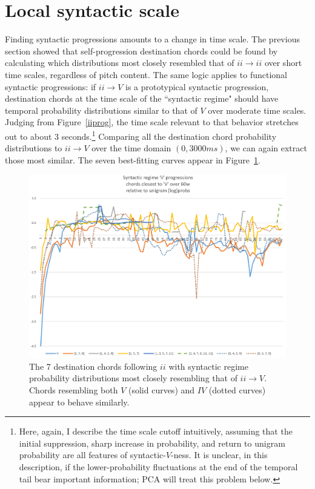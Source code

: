 \section{Local syntactic scale}
Finding syntactic progressions amounts to a change in time scale.  The previous section showed that self-progression destination chords could be found by calculating which distributions most closely resembled that of $ii\rightarrow ii$ over short time scales, regardless of pitch content.  The same logic applies to functional syntactic progressions: if $ii\rightarrow V$ is a prototypical syntactic progression, destination chords at the time scale of the ``syntactic regime" should have temporal probability distributions similar to that of $V$ over moderate time scales.  Judging from Figure~\ref{iiprog}, the time scale relevant to that behavior stretches out to about 3 seconds.\footnote{Here, again, I describe the time scale cutoff intuitively, assuming that the initial suppression, sharp increase in probability, and return to unigram probability are all features of syntactic-$V$-ness.  It is unclear, in this description, if the lower-probability fluctuations at the end of the temporal tail bear important information; PCA will treat this problem below.}  Comparing all the destination chord probability distributions to $ii \rightarrow V$ over the time domain $(0,3000ms)$, we can again extract those most similar.  The seven best-fitting curves appear in Figure~\ref{ii_syntactic}.

\begin{figure}
	\caption{The 7 destination chords following $ii$ with syntactic regime probability distributions most closely resembling that of $ii \rightarrow V$.  Chords resembling both $V$ (solid curves) and $IV$ (dotted curves) appear to behave similarly.}
	\label{ii_syntactic}
	\centering
	\includegraphics[width=6in]{ii_syntactic.png}
\end{figure}

